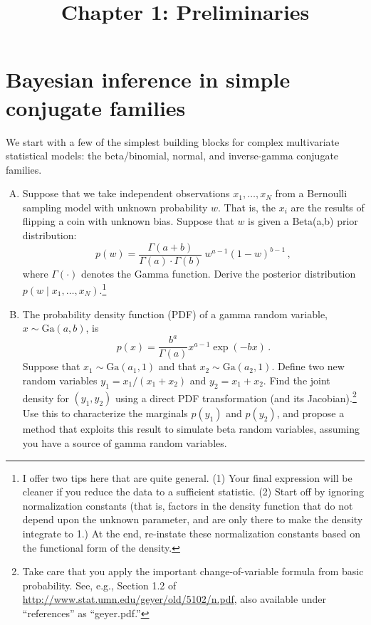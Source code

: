 \documentclass{mynotes}
\title[Chapter 1 $\cdot$ SSC 384D]{Chapter 1: Preliminaries}
\date{}  %
\begin{document}
\maketitle%

\section{Bayesian inference in simple conjugate families}

We start with a few of the simplest building blocks for complex multivariate statistical models: the beta/binomial, normal, and inverse-gamma conjugate families.

\begin{enumerate}[(A)]

\item Suppose that we take independent observations $x_1, \ldots, x_N$ from a Bernoulli sampling model with unknown probability $w$.  That is, the $x_i$ are the results of flipping a coin with unknown bias.  Suppose that $w$ is given a Beta(a,b) prior distribution:
$$
p(w) = \frac{\Gamma(a+b)}{\Gamma(a) \cdot \Gamma(b)} \ w^{a-1} (1-w)^{b-1} \, ,
$$
where $\Gamma(\cdot)$ denotes the Gamma function.  Derive the posterior distribution $p(w \mid x_1, \ldots, x_N)$.\footnote{I offer two tips here that are quite general.  (1) Your final expression will be cleaner if you reduce the data to a sufficient statistic.  (2) Start off by ignoring normalization constants (that is, factors in the density function that do not depend upon the unknown parameter, and are only there to make the density integrate to 1.)  At the end, re-instate these normalization constants based on the functional form of the density.}

\item The probability density function (PDF) of a gamma random variable, $x \sim \mbox{Ga}(a,b)$, is
$$
p(x) = \frac{b^a}{\Gamma(a)} x^{a-1} \exp(-bx) \, .
$$
Suppose that $x_1 \sim \mbox{Ga}(a_1,1)$ and that $x_2 \sim \mbox{Ga}(a_2,1)$.  Define two new random variables $y_1 = x_1/(x_1 + x_2)$ and $y_2 = x_1 + x_2$.  Find the joint density for $(y_1, y_2)$ using a direct PDF transformation (and its Jacobian).\footnote{Take care that you apply the important change-of-variable formula from basic probability.  See, e.g., Section 1.2 of \url{http://www.stat.umn.edu/geyer/old/5102/n.pdf}, also available under ``references'' as ``geyer.pdf.''}  Use this to characterize the  marginals $p(y_1)$ and $p(y_2)$, and propose a method that exploits this result to simulate beta random variables, assuming you have a source of gamma random variables.


\end{enumerate}
\end{document}
